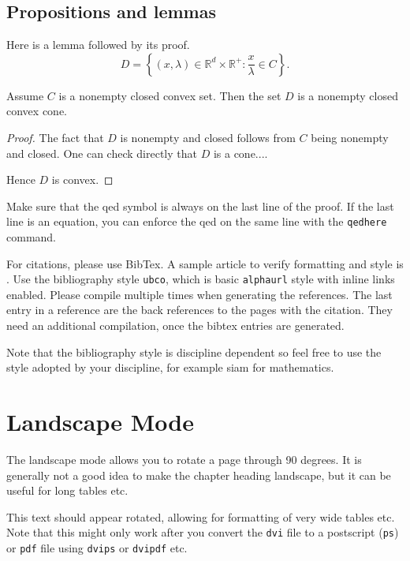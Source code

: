 \documentclass[msc,oneside]{ubcthesis}%
\newcommand{\R}{\mathbb{R}}   %
\begin{document}
\section{Propositions and lemmas}
Here is a lemma followed by its proof.
\[
D =\left\{ (x,\lambda)\in \R^d \times \R^+ : \frac{x}{\lambda} \in C\right\}.
\]


\begin{lemma}
Assume $C$ is a nonempty closed convex set. Then the set $D$ is a nonempty closed convex cone.
\end{lemma}

\begin{proof}
The fact that $D$ is nonempty and closed follows from $C$ being non\-empty and closed. One can check directly that $D$ is a cone....

Hence $D$ is convex.
\end{proof}
Make sure that the qed symbol is always on the last line of the proof. If the last line is an equation, you can enforce the qed on the same line with the \texttt{qedhere} command.

For citations, please use BibTex. A sample article to verify formatting and style is \cite{Bauschke:2007-PA02}. Use the bibliography style \texttt{ubco}, which is basic \texttt{alphaurl} style with inline links enabled. Please compile multiple times when generating the references. The last entry in a reference are the back references to the pages with the citation. They need an additional compilation, once the bibtex entries are generated.

Note that the bibliography style is discipline dependent so feel free to use the style adopted by your discipline, for example siam for mathematics.

\chapter{Landscape Mode}
The landscape mode allows you to rotate a page through 90 degrees.  It
is generally not a good idea to make the chapter heading landscape,
but it can be useful for long tables etc.

\begin{landscape}
  This text should appear rotated, allowing for formatting of very
  wide tables etc.  Note that this might only work after you convert
  the \texttt{dvi} file to a postscript (\texttt{ps}) or \texttt{pdf}
  file using \texttt{dvips} or \texttt{dvipdf} etc.
\end{landscape}
\end{document}
